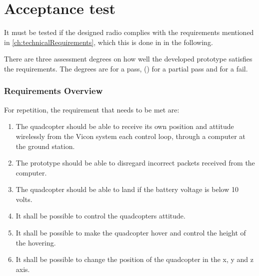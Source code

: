 \chapter{Acceptance test}

It must be tested if the designed radio complies with the requirements mentioned in \autoref{ch:technicalRequirements}, which this is done in in the following. %

There are three assessment degrees on how well the developed prototype satisfies the requirements. The degrees are  for a pass, () for a partial pass and  for a fail. 

\subsection*{Requirements Overview}
For repetition, the requirement that needs to be met are:
\begin{enumerate}[label=\textbf{\arabic*})]
\item {The quadcopter should be able to receive its own position and attitude wirelessly from the Vicon system each control loop, through a computer at the ground station.}
\item {The prototype should be able to disregard incorrect packets received from the computer.}
\item {The quadcopter should be able to land if the battery voltage is below 10 volts.}
\item {It shall be possible to control the quadcopters attitude.}
\item {It shall be possible to make the quadcopter hover and control the height of the hovering.}
\item {It shall be possible to change the position of the quadcopter in the x, y and z axis.}
\end{enumerate}

\newpage
